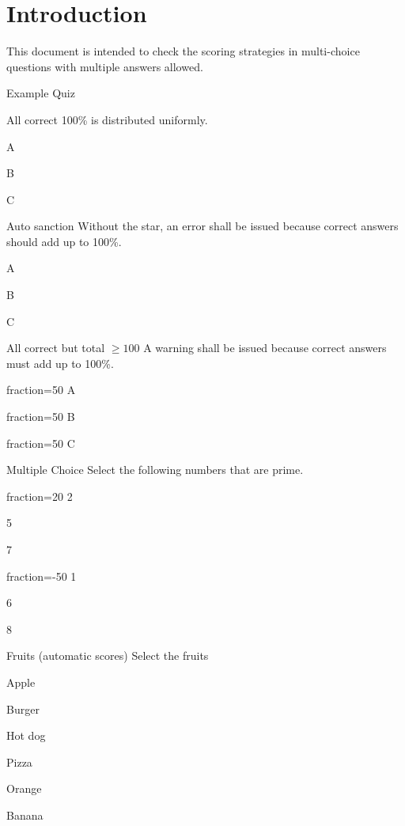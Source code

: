 \documentclass{article}
\begin{document}
\section*{Introduction}

This document is intended to check the scoring strategies in multi-choice
questions with multiple answers allowed.

\begin{quiz}[multiple]{Example Quiz}
\begin{multi}{All correct}
100\% is distributed uniformly.
\item* A
\item* B
\item* C
\end{multi}
\begin{multi}{Auto sanction}
Without the star, an error shall be issued because correct answers should add
up to 100\%.
\item* A
\item B
\item C
\end{multi}
\begin{multi}{All correct but total $\geq 100$}
A warning shall be issued because correct answers must add up to 100\%.
\item[fraction=50] A
\item[fraction=50] B
\item[fraction=50] C
\end{multi}
\begin{multi}{Multiple Choice}
Select the following numbers that are prime.
\item[fraction=20] 2
\item* 5
\item* 7
\item[fraction=-50] 1
\item 6
\item 8
\end{multi}
\begin{multi}{Fruits (automatic scores)}
Select the fruits
\item* Apple%
\item Burger%
\item Hot dog%
\item Pizza%
\item* Orange%
\item* Banana%
\end{multi}

\end{quiz}
\end{document}
